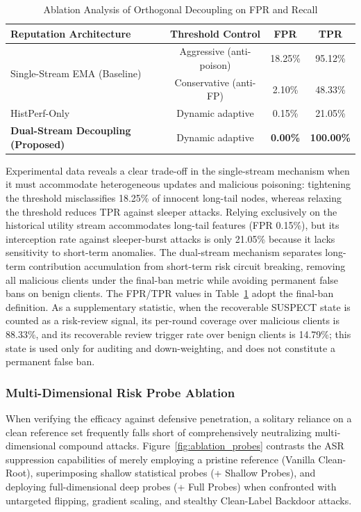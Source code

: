 \documentclass[11pt, a4paper]{article}
\begin{document}
\begin{table}[t]
    \centering
    \caption{Ablation Analysis of Orthogonal Decoupling on FPR and Recall}
    \label{tab:ablation_stream}
    \begin{tabular}{l c c c}
        \toprule
        \textbf{Reputation Architecture}              & \textbf{Threshold Control} & \textbf{FPR}    & \textbf{TPR}      \\
        \midrule
        \multirow{2}{*}{Single-Stream EMA (Baseline)} & Aggressive (anti-poison)   & 18.25\%         & 95.12\%           \\
                                                      & Conservative (anti-FP)     & 2.10\%          & 48.33\%           \\
        \midrule
        HistPerf-Only                                 & Dynamic adaptive           & 0.15\%          & 21.05\%           \\
        \textbf{Dual-Stream Decoupling (Proposed)}    & Dynamic adaptive           & \textbf{0.00\%} & \textbf{100.00\%} \\
        \bottomrule
    \end{tabular}
\end{table}

Experimental data reveals a clear trade-off in the single-stream mechanism when it must accommodate heterogeneous updates and malicious poisoning: tightening the threshold misclassifies 18.25\% of innocent long-tail nodes, whereas relaxing the threshold reduces TPR against sleeper attacks. Relying exclusively on the historical utility stream accommodates long-tail features (FPR 0.15\%), but its interception rate against sleeper-burst attacks is only 21.05\% because it lacks sensitivity to short-term anomalies. The dual-stream mechanism separates long-term contribution accumulation from short-term risk circuit breaking, removing all malicious clients under the final-ban metric while avoiding permanent false bans on benign clients. The FPR/TPR values in Table~\ref{tab:ablation_stream} adopt the final-ban definition. As a supplementary statistic, when the recoverable SUSPECT state is counted as a risk-review signal, its per-round coverage over malicious clients is 88.33\%, and its recoverable review trigger rate over benign clients is 14.79\%; this state is used only for auditing and down-weighting, and does not constitute a permanent false ban.

\subsubsection{Multi-Dimensional Risk Probe Ablation}
When verifying the efficacy against defensive penetration, a solitary reliance on a clean reference set frequently falls short of comprehensively neutralizing multi-dimensional compound attacks. Figure~\ref{fig:ablation_probes} contrasts the ASR suppression capabilities of merely employing a pristine reference (Vanilla Clean-Root), superimposing shallow statistical probes (+ Shallow Probes), and deploying full-dimensional deep probes (+ Full Probes) when confronted with untargeted flipping, gradient scaling, and stealthy Clean-Label Backdoor attacks.
\end{document}
